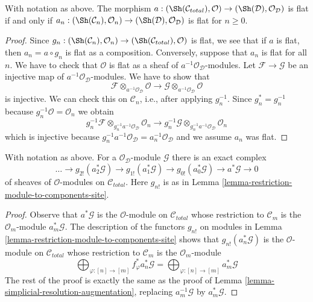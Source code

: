 \begin{lemma}
\label{lemma-flat-augmentation-modules}
With notation as above. The morphism
$a : (\Sh(\mathcal{C}_{total}), \mathcal{O}) \to
(\Sh(\mathcal{D}), \mathcal{O}_\mathcal{D})$
is flat if and only if
$a_n : (\Sh(\mathcal{C}_n), \mathcal{O}_n) \to
(\Sh(\mathcal{D}), \mathcal{O}_\mathcal{D})$
is flat for $n \geq 0$.
\end{lemma}

\begin{proof}
Since $g_n : (\Sh(\mathcal{C}_n), \mathcal{O}_n) \to
(\Sh(\mathcal{C}_{total}), \mathcal{O})$ is flat, we see
that if $a$ is flat, then $a_n = a \circ g_n$ is flat as
a composition. Conversely, suppose that $a_n$ is flat for all $n$.
We have to check that $\mathcal{O}$ is flat as a sheaf of
$a^{-1}\mathcal{O}_\mathcal{D}$-modules. Let $\mathcal{F} \to \mathcal{G}$
be an injective map of $a^{-1}\mathcal{O}_\mathcal{D}$-modules.
We have to show that
$$
\mathcal{F} \otimes_{a^{-1}\mathcal{O}_\mathcal{D}} \mathcal{O}
\to
\mathcal{G} \otimes_{a^{-1}\mathcal{O}_\mathcal{D}} \mathcal{O}
$$
is injective. We can check this on $\mathcal{C}_n$, i.e., after
applying $g_n^{-1}$. Since $g_n^* = g_n^{-1}$ because
$g_n^{-1}\mathcal{O} = \mathcal{O}_n$ we obtain
$$
g_n^{-1}\mathcal{F} \otimes_{g_n^{-1}a^{-1}\mathcal{O}_\mathcal{D}}
\mathcal{O}_n
\to
g_n^{-1}\mathcal{G} \otimes_{g_n^{-1}a^{-1}\mathcal{O}_\mathcal{D}}
\mathcal{O}_n
$$
which is injective because
$g_n^{-1}a^{-1}\mathcal{O}_\mathcal{D} = a_n^{-1}\mathcal{O}_\mathcal{D}$
and we assume $a_n$ was flat.
\end{proof}

\begin{lemma}
\label{lemma-simplicial-resolution-augmentation-modules}
With notation as above. For a $\mathcal{O}_\mathcal{D}$-module $\mathcal{G}$
there is an exact complex
$$
\ldots \to
g_{2!}(a_2^*\mathcal{G}) \to
g_{1!}(a_1^*\mathcal{G}) \to
g_{0!}(a_0^*\mathcal{G}) \to
a^*\mathcal{G} \to 0
$$
of sheaves of $\mathcal{O}$-modules on $\mathcal{C}_{total}$.
Here $g_{n!}$ is as in Lemma \ref{lemma-restriction-module-to-components-site}.
\end{lemma}

\begin{proof}
Observe that $a^*\mathcal{G}$ is the $\mathcal{O}$-module on
$\mathcal{C}_{total}$ whose restriction to $\mathcal{C}_m$
is the $\mathcal{O}_m$-module $a_m^*\mathcal{G}$.
The description of the functors $g_{n!}$ on modules
in Lemma \ref{lemma-restriction-module-to-components-site}
shows that $g_{n!}(a_n^*\mathcal{G})$ is the
$\mathcal{O}$-module on $\mathcal{C}_{total}$
whose restriction to $\mathcal{C}_m$ is the $\mathcal{O}_m$-module
$$
\bigoplus\nolimits_{\varphi : [n] \to [m]} f_\varphi^*a_n^*\mathcal{G} =
\bigoplus\nolimits_{\varphi : [n] \to [m]} a_m^*\mathcal{G}
$$
The rest of the proof is exactly the same as the proof of
Lemma \ref{lemma-simplicial-resolution-augmentation},
replacing $a_m^{-1}\mathcal{G}$ by $a_m^*\mathcal{G}$.
\end{proof}

